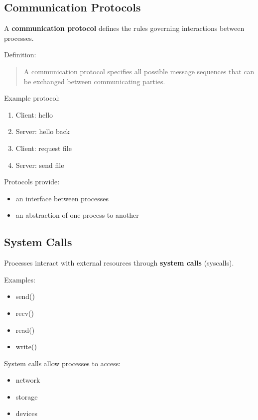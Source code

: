 \subsection{Communication Protocols}

A \textbf{communication protocol} defines the rules governing interactions between processes.

Definition:

\begin{quote}
A communication protocol specifies all possible message sequences that can be exchanged between communicating parties.
\end{quote}

Example protocol:

\begin{enumerate}
\item Client: hello
\item Server: hello back
\item Client: request file
\item Server: send file
\end{enumerate}

Protocols provide:

\begin{itemize}
\item an interface between processes
\item an abstraction of one process to another
\end{itemize}

\subsection{System Calls}

Processes interact with external resources through \textbf{system calls} (syscalls).

Examples:

\begin{itemize}
\item send()
\item recv()
\item read()
\item write()
\end{itemize}

System calls allow processes to access:

\begin{itemize}
\item network
\item storage
\item devices
\end{itemize}

